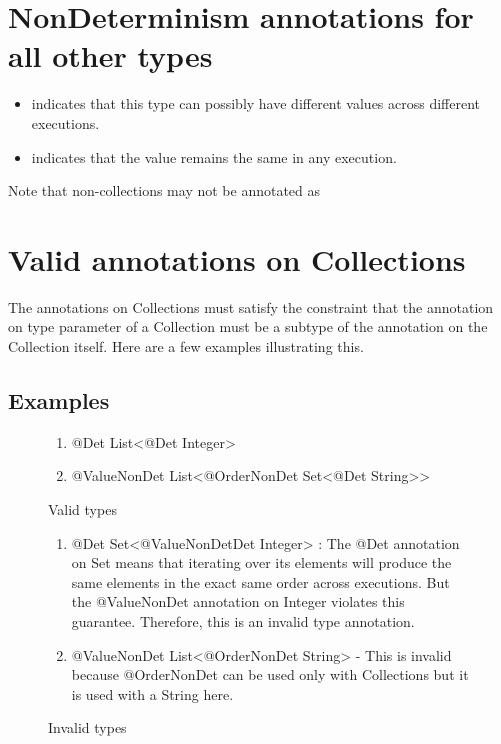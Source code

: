 \section{NonDeterminism annotations for all other types\label{nondeterminism-annotations-elements}}

\begin{itemize}
\item
   indicates
  that this type can possibly have different values across different executions. 
 \item
   indicates that
  the value remains the same in any execution.
\end{itemize}

Note that non-collections may not be annotated as 

\section{Valid annotations on Collections\label{type-validity}}
The annotations on Collections must satisfy the constraint that the annotation on type parameter of a Collection must be a
subtype of the annotation on the Collection itself. Here are a few examples illustrating this.

\subsection{Examples\label{SubSec:ex}}
\begin{figure}[h]\caption{Valid types}
	\begin{enumerate}
		\item @Det List<@Det Integer> 
		\item @ValueNonDet List<@OrderNonDet Set<@Det String>> 
	\end{enumerate}
\end{figure}

\begin{figure}[h]\caption{Invalid types}
	\begin{enumerate}
		\item @Det Set<@ValueNonDetDet Integer> : The @Det annotation on Set means that iterating over its elements will produce the same elements in the exact same order across executions. But the @ValueNonDet annotation on Integer violates this guarantee. Therefore, this is an invalid type annotation.
		\item @ValueNonDet List<@OrderNonDet String> - This is invalid because @OrderNonDet can be used only with Collections but it is used with a String here.
	\end{enumerate}
\end{figure}

